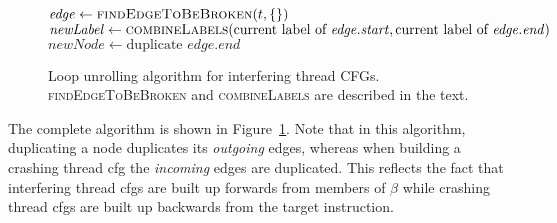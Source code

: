 \begin{figure}
\begin{algorithmic}
       \State $\mathit{edge} \gets \textsc{findEdgeToBeBroken}(t, \{\})$
       \State $\mathit{newLabel} \gets \textsc{combineLabels}(\text{current label of } \mathit{edge}.\mathit{start}, \text{current label of } \mathit{edge}.\mathit{end})$
       \Else
           \State $\mathit{newNode} \gets \text{duplicate } \mathit{edge}.\mathit{end}$
           \EndFor
       \EndIf
    \EndWhile
  \EndFor
\end{algorithmic}
\vspace{-6pt}
\caption{Loop unrolling algorithm for interfering thread CFGs.
  \textsc{findEdgeToBeBroken} and \textsc{combineLabels} are described
  in the text.}
\label{fig:derive:store_cfg_unroll_alg}
\end{figure}

The complete algorithm is shown in
Figure~\ref{fig:derive:store_cfg_unroll_alg}.  Note that in this
algorithm, duplicating a node duplicates its \emph{outgoing} edges,
whereas when building a crashing thread \gls{cfg} the \emph{incoming}
edges are duplicated.  This reflects the fact that interfering thread
\glspl{cfg} are built up forwards from members of $\beta$ while
crashing thread \glspl{cfg} are built up backwards from the target
instruction.

